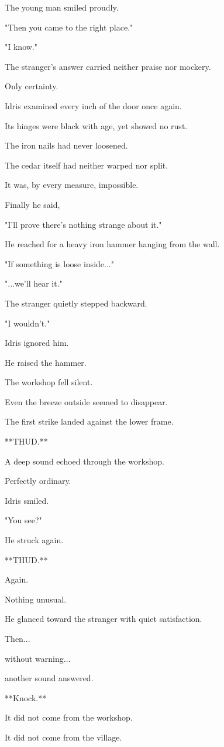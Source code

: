 \documentclass[12pt,openany]{book}
\begin{document}
The young man smiled proudly.

"Then you came to the right place."

"I know."

The stranger's answer carried neither praise nor mockery.

Only certainty.

Idris examined every inch of the door once again.

Its hinges were black with age, yet showed no rust.

The iron nails had never loosened.

The cedar itself had neither warped nor split.

It was, by every measure, impossible.

Finally he said,

"I'll prove there's nothing strange about it."

He reached for a heavy iron hammer hanging from the wall.

"If something is loose inside..."

"...we'll hear it."

The stranger quietly stepped backward.

"I wouldn't."

Idris ignored him.

He raised the hammer.

The workshop fell silent.

Even the breeze outside seemed to disappear.

The first strike landed against the lower frame.

**THUD.**

A deep sound echoed through the workshop.

Perfectly ordinary.

Idris smiled.

"You see?"

He struck again.

**THUD.**

Again.

Nothing unusual.

He glanced toward the stranger with quiet satisfaction.

Then...

without warning...

another sound answered.

**Knock.**

It did not come from the workshop.

It did not come from the village.
\end{document}
